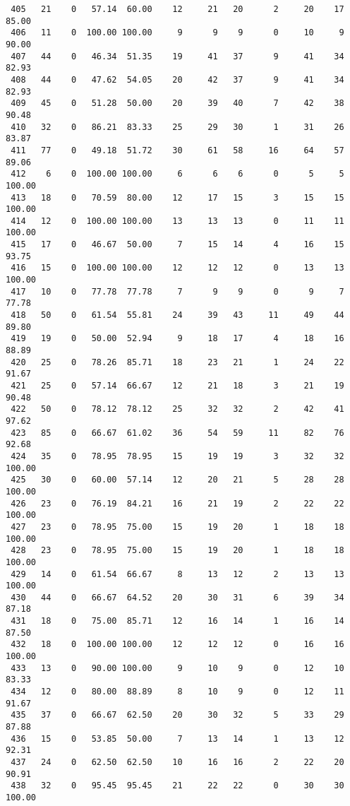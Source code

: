 \begin{verbatim}
 405   21    0   57.14  60.00    12     21   20      2     20    17    85.00
 406   11    0  100.00 100.00     9      9    9      0     10     9    90.00
 407   44    0   46.34  51.35    19     41   37      9     41    34    82.93
 408   44    0   47.62  54.05    20     42   37      9     41    34    82.93
 409   45    0   51.28  50.00    20     39   40      7     42    38    90.48
 410   32    0   86.21  83.33    25     29   30      1     31    26    83.87
 411   77    0   49.18  51.72    30     61   58     16     64    57    89.06
 412    6    0  100.00 100.00     6      6    6      0      5     5   100.00
 413   18    0   70.59  80.00    12     17   15      3     15    15   100.00
 414   12    0  100.00 100.00    13     13   13      0     11    11   100.00
 415   17    0   46.67  50.00     7     15   14      4     16    15    93.75
 416   15    0  100.00 100.00    12     12   12      0     13    13   100.00
 417   10    0   77.78  77.78     7      9    9      0      9     7    77.78
 418   50    0   61.54  55.81    24     39   43     11     49    44    89.80
 419   19    0   50.00  52.94     9     18   17      4     18    16    88.89
 420   25    0   78.26  85.71    18     23   21      1     24    22    91.67
 421   25    0   57.14  66.67    12     21   18      3     21    19    90.48
 422   50    0   78.12  78.12    25     32   32      2     42    41    97.62
 423   85    0   66.67  61.02    36     54   59     11     82    76    92.68
 424   35    0   78.95  78.95    15     19   19      3     32    32   100.00
 425   30    0   60.00  57.14    12     20   21      5     28    28   100.00
 426   23    0   76.19  84.21    16     21   19      2     22    22   100.00
 427   23    0   78.95  75.00    15     19   20      1     18    18   100.00
 428   23    0   78.95  75.00    15     19   20      1     18    18   100.00
 429   14    0   61.54  66.67     8     13   12      2     13    13   100.00
 430   44    0   66.67  64.52    20     30   31      6     39    34    87.18
 431   18    0   75.00  85.71    12     16   14      1     16    14    87.50
 432   18    0  100.00 100.00    12     12   12      0     16    16   100.00
 433   13    0   90.00 100.00     9     10    9      0     12    10    83.33
 434   12    0   80.00  88.89     8     10    9      0     12    11    91.67
 435   37    0   66.67  62.50    20     30   32      5     33    29    87.88
 436   15    0   53.85  50.00     7     13   14      1     13    12    92.31
 437   24    0   62.50  62.50    10     16   16      2     22    20    90.91
 438   32    0   95.45  95.45    21     22   22      0     30    30   100.00

\end{verbatim}
